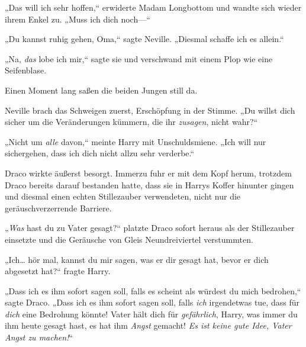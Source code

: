 „Das will ich sehr hoffen,“ erwiderte Madam Longbottom und wandte sich wieder ihrem Enkel zu. „Muss ich dich noch—“

„Du kannst ruhig gehen, Oma,“ sagte Neville. „Diesmal schaffe ich es allein.“

„Na, \emph{das} lobe ich mir,“ sagte sie und verschwand mit einem Plop wie eine Seifenblase.

Einen Moment lang saßen die beiden Jungen still da.

Neville brach das Schweigen zuerst, Erschöpfung in der Stimme. „Du willst dich sicher um die Veränderungen kümmern, die ihr \emph{zusagen}, nicht wahr?“

„Nicht um \emph{alle} davon,“ meinte Harry mit Unschuldsmiene. „Ich will nur sichergehen, dass ich dich nicht allzu sehr verderbe.“

\later

Draco wirkte äußerst besorgt. Immerzu fuhr er mit dem Kopf herum, trotzdem Draco bereits darauf bestanden hatte, dass sie in Harrys Koffer hinunter gingen und diesmal einen echten Stillezauber verwendeten, nicht nur die geräuschverzerrende Barriere.

„\emph{Was} hast du zu Vater gesagt?“ platzte Draco sofort heraus als der Stillezauber einsetzte und die Geräusche von Gleis Neundreiviertel verstummten.

„Ich… hör mal, kannst du mir sagen, was er dir gesagt hat, bevor er dich abgesetzt hat?“ fragte Harry.

„Dass ich es ihm sofort sagen soll, falls es scheint als würdest du mich bedrohen,“ sagte Draco. „Dass ich es ihm sofort sagen soll, falls \emph{ich} irgendetwas tue, dass für \emph{dich} eine Bedrohung könnte! Vater hält dich für \emph{gefährlich}, Harry, was immer du ihm heute gesagt hast, es hat ihm \emph{Angst} gemacht! \emph{Es ist keine gute Idee, Vater Angst zu machen!}“

